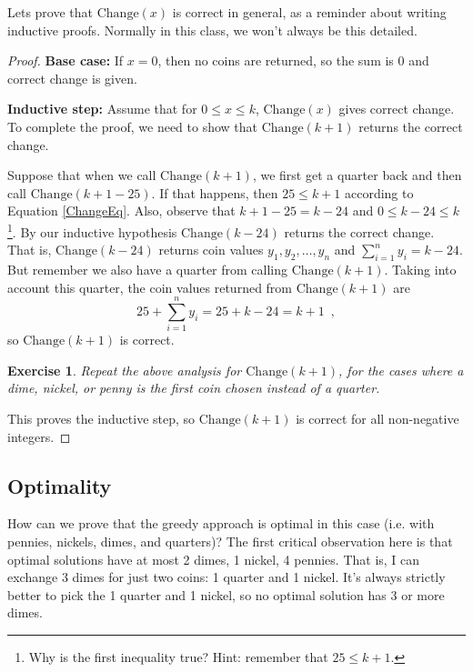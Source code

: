 \documentclass[paper=a4, fontsize=11pt]{scrartcl} %
\numberwithin{equation}{section} %
\numberwithin{figure}{section} %
\numberwithin{table}{section} %
\newtheorem{exercise}{Exercise} %
\begin{document}
Lets prove that $\mathrm{Change}(x)$ is correct in general, as a reminder about writing inductive proofs.
Normally in this class, we won't always be this detailed.

\begin{proof}
\textbf{Base case:} If $x = 0$, then no coins are returned, so the sum is $0$ and correct change is given.

\textbf{Inductive step:} Assume that for $0 \leq x \leq k$, $\mathrm{Change}(x)$ gives correct change.
To complete the proof, we need to show that $\mathrm{Change}(k + 1)$ returns the correct change.

Suppose that when we call $\mathrm{Change}(k + 1)$, we first get a quarter back and then call $\mathrm{Change}(k + 1 - 25)$.
If that happens, then $25 \leq k + 1$ according to Equation \ref{ChangeEq}.
Also, observe that $k + 1 - 25 = k - 24$ and $0 \leq k - 24 \leq k$ \footnote{Why is the first inequality true? Hint: remember that $25 \leq k + 1$.}.
By our inductive hypothesis $\mathrm{Change}(k - 24)$ returns the correct change.
That is, $\mathrm{Change}(k - 24)$ returns coin values $y_1, y_2, \ldots, y_n$ and $\sum_{i=1}^n y_i = k - 24$.
But remember we also have a quarter from calling $\mathrm{Change}(k + 1)$.
Taking into account this quarter, the coin values returned from $\mathrm{Change}(k + 1)$ are
\begin{equation*}
    25 + \sum_{i=1}^n y_i = 25 + k - 24 = k + 1 \enspace ,
\end{equation*}
so $\mathrm{Change}(k + 1)$ is correct.

\begin{exercise}
Repeat the above analysis for $\mathrm{Change}(k + 1)$, for the cases where a dime, nickel, or penny is the first coin chosen instead of a quarter.
\end{exercise}

This proves the inductive step, so $\mathrm{Change}(k + 1)$ is correct for all non-negative integers.
\end{proof}

\subsection{Optimality}
How can we prove that the greedy approach is optimal in this case (i.e. with pennies, nickels, dimes, and quarters)?
The first critical observation here is that optimal solutions have at most 2 dimes, 1 nickel, 4 pennies.
That is, I can exchange 3 dimes for just two coins: 1 quarter and 1 nickel.
It's always strictly better to pick the 1 quarter and 1 nickel, so no optimal solution has 3 or more dimes.
\end{document}
